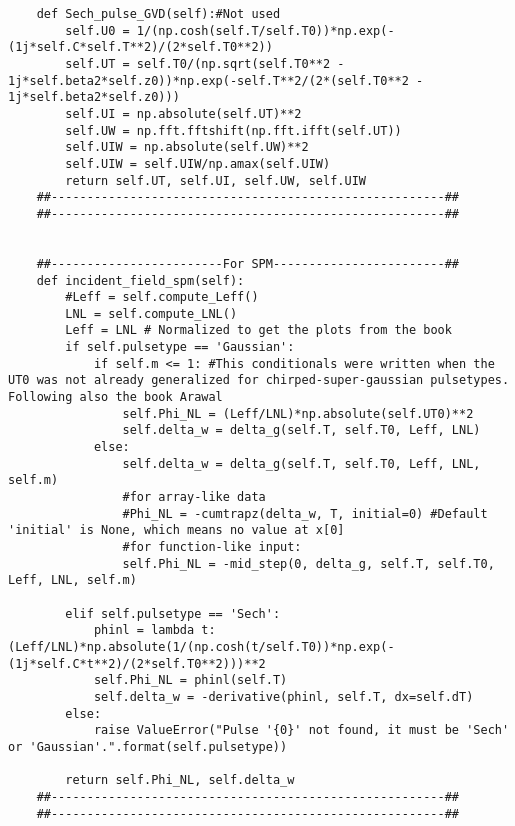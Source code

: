 \begin{verbatim}
    def Sech_pulse_GVD(self):#Not used 
        self.U0 = 1/(np.cosh(self.T/self.T0))*np.exp(-(1j*self.C*self.T**2)/(2*self.T0**2))
        self.UT = self.T0/(np.sqrt(self.T0**2 - 1j*self.beta2*self.z0))*np.exp(-self.T**2/(2*(self.T0**2 - 1j*self.beta2*self.z0)))
        self.UI = np.absolute(self.UT)**2
        self.UW = np.fft.fftshift(np.fft.ifft(self.UT))
        self.UIW = np.absolute(self.UW)**2
        self.UIW = self.UIW/np.amax(self.UIW) 
        return self.UT, self.UI, self.UW, self.UIW
    ##-------------------------------------------------------##
    ##-------------------------------------------------------##


    ##------------------------For SPM------------------------##
    def incident_field_spm(self):
        #Leff = self.compute_Leff()
        LNL = self.compute_LNL()
        Leff = LNL # Normalized to get the plots from the book
        if self.pulsetype == 'Gaussian':
            if self.m <= 1: #This conditionals were written when the UT0 was not already generalized for chirped-super-gaussian pulsetypes. Following also the book Arawal
                self.Phi_NL = (Leff/LNL)*np.absolute(self.UT0)**2
                self.delta_w = delta_g(self.T, self.T0, Leff, LNL)
            else: 
                self.delta_w = delta_g(self.T, self.T0, Leff, LNL, self.m)
                #for array-like data
                #Phi_NL = -cumtrapz(delta_w, T, initial=0) #Default 'initial' is None, which means no value at x[0] 
                #for function-like input:
                self.Phi_NL = -mid_step(0, delta_g, self.T, self.T0, Leff, LNL, self.m)

        elif self.pulsetype == 'Sech':
            phinl = lambda t: (Leff/LNL)*np.absolute(1/(np.cosh(t/self.T0))*np.exp(-(1j*self.C*t**2)/(2*self.T0**2)))**2
            self.Phi_NL = phinl(self.T)
            self.delta_w = -derivative(phinl, self.T, dx=self.dT)
        else:
            raise ValueError("Pulse '{0}' not found, it must be 'Sech' or 'Gaussian'.".format(self.pulsetype))

        return self.Phi_NL, self.delta_w
    ##-------------------------------------------------------##
    ##-------------------------------------------------------##


\end{verbatim}
